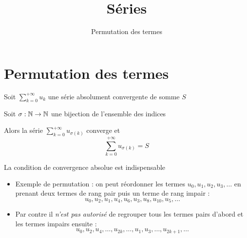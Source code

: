 

   





\title{{\bf Séries}}
\subtitle{Permutation des termes}

\begin{frame}
  
  \debutmontitre


\end{frame}

\setcounter{framenumber}{0}



\section{Permutation des termes}

\begin{frame}
\begin{theoreme}
Soit $\displaystyle\sum_{k=0}^{+\infty} u_k$ une série absolument convergente de somme $S$

\pause
Soit $\sigma : \mathbb{N} \to \mathbb{N}$ une bijection de l'ensemble des indices

\pause
Alors la série $\displaystyle \sum_{k=0}^{+\infty} u_{\sigma(k)}$ converge
\pause et $$\sum_{k=0}^{+\infty} u_{\sigma(k)} = S$$
\end{theoreme}

\pause
La condition de convergence absolue est indispensable
\end{frame}

\begin{frame}
\begin{itemize}
\item Exemple de permutation : on peut réordonner les termes $u_0,u_1,u_2,u_3,\ldots$ 
en prenant deux termes de rang pair puis un terme de rang impair :
$$u_0, u_2, u_1, u_4, u_6, u_3, u_8, u_{10}, u_5,\ldots$$
\item\pause Par contre il \emph{n'est pas autorisé} de regrouper tous les termes pairs d'abord et 
les termes impairs ensuite :
$$u_0,u_2, u_4,\ldots, u_{2k},\ldots,u_1,u_3,\ldots, u_{2k+1},\ldots$$
\end{itemize}

\end{frame}

